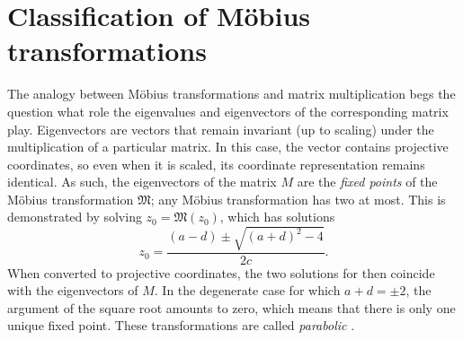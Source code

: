 \section{Classification of Möbius transformations}
\label{sec:classification}
The analogy between Möbius transformations and matrix multiplication begs the question  what role the eigenvalues and eigenvectors of the corresponding matrix play. Eigenvectors are vectors that remain invariant (up to scaling) under the multiplication of a particular matrix. In this case, the vector contains projective coordinates, so even when it is scaled, its coordinate representation remains identical. As such, the eigenvectors of the matrix \(M\) are the \emph{fixed points} of the Möbius transformation \(\mathfrak{M}\); any Möbius transformation has two at most. This is demonstrated by solving \(z_0 = \mathfrak{M}(z_0)\), which has solutions
\[ z_0 = \frac{(a - d) \pm \sqrt{(a + d)^2 - 4}}{2c}.\]
When converted to projective coordinates, the two solutions for  then coincide with the eigenvectors of \(M\). In the degenerate case for which \(a + d = \pm2\), the argument of the square root amounts to zero, which means that there is only one unique fixed point. These transformations are called \emph{parabolic} \cite{Needham1997}.

